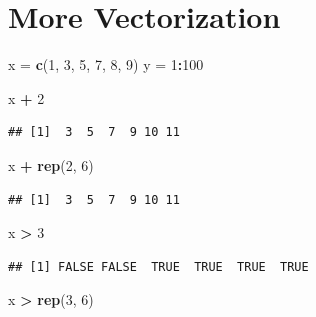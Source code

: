 \documentclass[]{book}
\newenvironment{Shaded}{\begin{snugshade}}{\end{snugshade}}
\newcommand{\KeywordTok}[1]{\textcolor[rgb]{0.13,0.29,0.53}{\textbf{#1}}}
\newcommand{\DecValTok}[1]{\textcolor[rgb]{0.00,0.00,0.81}{#1}}
\newcommand{\StringTok}[1]{\textcolor[rgb]{0.31,0.60,0.02}{#1}}
\newcommand{\OperatorTok}[1]{\textcolor[rgb]{0.81,0.36,0.00}{\textbf{#1}}}
\newcommand{\NormalTok}[1]{#1}
\theoremstyle{definition}
\theoremstyle{definition}
\theoremstyle{definition}
\theoremstyle{remark}
\begin{document}
\section{More Vectorization}\label{more-vectorization}

\begin{Shaded}
\begin{Highlighting}[]
\NormalTok{x =}\StringTok{ }\KeywordTok{c}\NormalTok{(}\DecValTok{1}\NormalTok{, }\DecValTok{3}\NormalTok{, }\DecValTok{5}\NormalTok{, }\DecValTok{7}\NormalTok{, }\DecValTok{8}\NormalTok{, }\DecValTok{9}\NormalTok{)}
\NormalTok{y =}\StringTok{ }\DecValTok{1}\OperatorTok{:}\DecValTok{100}
\end{Highlighting}
\end{Shaded}

\begin{Shaded}
\begin{Highlighting}[]
\NormalTok{x }\OperatorTok{+}\StringTok{ }\DecValTok{2}
\end{Highlighting}
\end{Shaded}

\begin{verbatim}
## [1]  3  5  7  9 10 11
\end{verbatim}

\begin{Shaded}
\begin{Highlighting}[]
\NormalTok{x }\OperatorTok{+}\StringTok{ }\KeywordTok{rep}\NormalTok{(}\DecValTok{2}\NormalTok{, }\DecValTok{6}\NormalTok{)}
\end{Highlighting}
\end{Shaded}

\begin{verbatim}
## [1]  3  5  7  9 10 11
\end{verbatim}

\begin{Shaded}
\begin{Highlighting}[]
\NormalTok{x }\OperatorTok{>}\StringTok{ }\DecValTok{3}
\end{Highlighting}
\end{Shaded}

\begin{verbatim}
## [1] FALSE FALSE  TRUE  TRUE  TRUE  TRUE
\end{verbatim}

\begin{Shaded}
\begin{Highlighting}[]
\NormalTok{x }\OperatorTok{>}\StringTok{ }\KeywordTok{rep}\NormalTok{(}\DecValTok{3}\NormalTok{, }\DecValTok{6}\NormalTok{)}
\end{Highlighting}
\end{Shaded}
\end{document}
